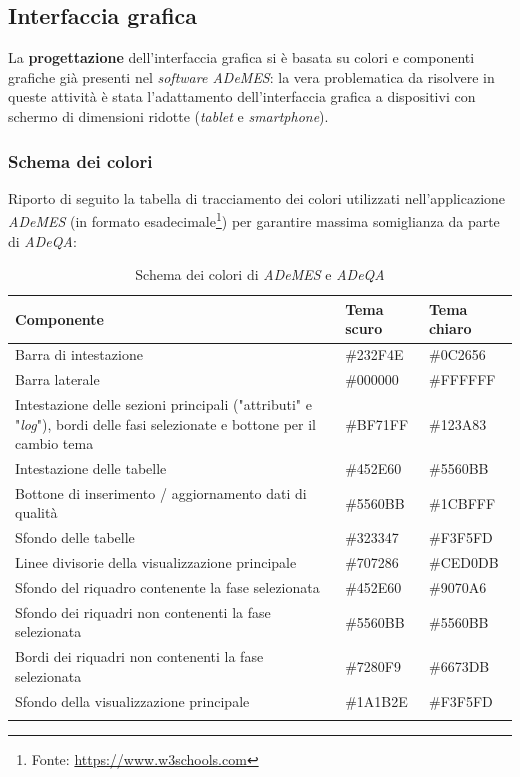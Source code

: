 \subsection{Interfaccia grafica}
\label{subsec:interfaccia}
La \textbf{progettazione} dell'interfaccia grafica si è basata su colori e componenti grafiche già presenti nel \textit{software ADeMES}: la vera problematica da risolvere in queste attività è stata l'adattamento dell'interfaccia grafica a dispositivi con schermo di dimensioni ridotte (\textit{tablet} e \textit{smartphone}).

\subsubsection*{Schema dei colori}
Riporto di seguito la tabella di tracciamento dei colori utilizzati nell'applicazione \textit{ADeMES} (in formato esadecimale\footnote{Fonte: \href{https://www.w3schools.com/colors/colors_hexadecimal.asp}{https://www.w3schools.com}}) per garantire massima somiglianza da parte di \textit{ADeQA}:
\begin{longtable}{>{\centering\arraybackslash}m{}>{\centering\arraybackslash}m{}>{\centering\arraybackslash}m{}}
    \hline
    \rowcolor{black}
    \color{white}\textbf{Componente} & \color{white}\textbf{Tema scuro} & \color{white}\textbf{Tema chiaro} \\
    \hline
    \endhead %
    Barra di intestazione & \#232F4E & \#0C2656 \\
    \hline
    Barra laterale & \#000000 & \#FFFFFF \\
    \hline
    Intestazione delle sezioni principali ("attributi" e "\textit{log}"), bordi delle fasi selezionate e bottone per il cambio tema & \#BF71FF & \#123A83 \\
    \hline
    Intestazione delle tabelle & \#452E60 & \#5560BB \\
    \hline
    Bottone di inserimento / aggiornamento dati di qualità & \#5560BB & \#1CBFFF \\
    \hline
    Sfondo delle tabelle & \#323347 & \#F3F5FD \\
    \hline
    Linee divisorie della visualizzazione principale & \#707286 & \#CED0DB \\
    \hline
    Sfondo del riquadro contenente la fase selezionata & \#452E60 & \#9070A6 \\
    \hline
    Sfondo dei riquadri non contenenti la fase selezionata & \#5560BB & \#5560BB \\
    \hline
    Bordi dei riquadri non contenenti la fase selezionata & \#7280F9 & \#6673DB \\
    \hline
    Sfondo della visualizzazione principale & \#1A1B2E & \#F3F5FD \\
    \hline
    \caption{Schema dei colori di \textit{ADeMES} e \textit{ADeQA}}
    \label{tab:colors}
\end{longtable}


